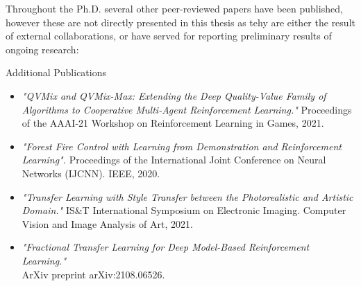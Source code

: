 Throughout the Ph.D. several other peer-reviewed papers have been published, however these are not directly presented in this thesis as tehy are either the result of external collaborations, or have served for reporting preliminary results of ongoing research:

\begin{takeaway}{Additional Publications}
\begin{itemize}
	\item \citet{leroy21qvmix} \textit{"QVMix and QVMix-Max: Extending the Deep Quality-Value Family of Algorithms to Cooperative Multi-Agent Reinforcement Learning."} Proceedings of the AAAI-21 Workshop on Reinforcement Learning in Games, 2021. 
	\item \citet{hammond2020forest} \textit{"Forest Fire Control with Learning from Demonstration and Reinforcement Learning".} Proceedings of the International Joint Conference on Neural Networks (IJCNN). IEEE, 2020.
	\item \citet{banartransfer} \textit{"Transfer Learning with Style Transfer between the Photorealistic and Artistic Domain."} IS\&T International Symposium on Electronic Imaging. Computer Vision and Image Analysis of Art, 2021.
	\item \citet{sasso2021fractional} \textit{"Fractional Transfer Learning for Deep Model-Based Reinforcement Learning."} \\ ArXiv preprint arXiv:2108.06526. 

\end{itemize}
\end{takeaway}
